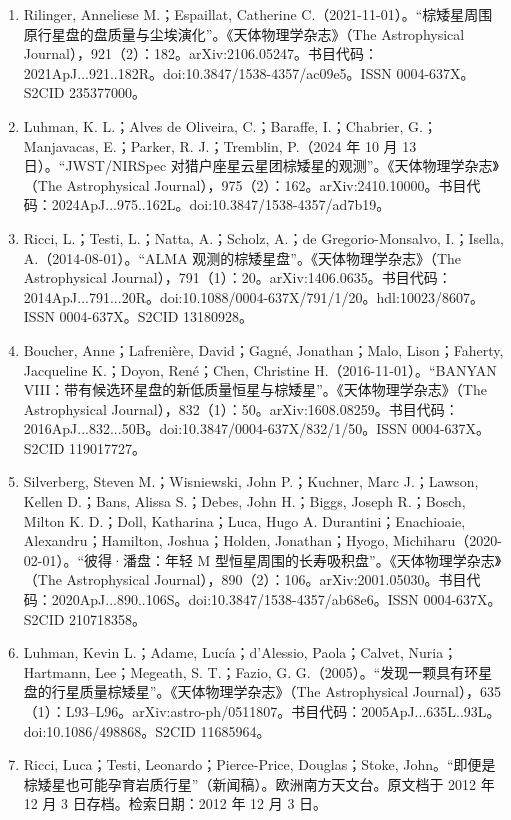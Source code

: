 \begin{enumerate}
\item Rilinger, Anneliese M.；Espaillat, Catherine C.（2021-11-01）。“棕矮星周围原行星盘的盘质量与尘埃演化”。《天体物理学杂志》（The Astrophysical Journal），921（2）：182。arXiv:2106.05247。书目代码：2021ApJ...921..182R。doi:10.3847/1538-4357/ac09e5。ISSN 0004-637X。S2CID 235377000。
\item Luhman, K. L.；Alves de Oliveira, C.；Baraffe, I.；Chabrier, G.；Manjavacas, E.；Parker, R. J.；Tremblin, P.（2024 年 10 月 13 日）。“JWST/NIRSpec 对猎户座星云星团棕矮星的观测”。《天体物理学杂志》（The Astrophysical Journal），975（2）：162。arXiv:2410.10000。书目代码：2024ApJ...975..162L。doi:10.3847/1538-4357/ad7b19。
\item Ricci, L.；Testi, L.；Natta, A.；Scholz, A.；de Gregorio-Monsalvo, I.；Isella, A.（2014-08-01）。“ALMA 观测的棕矮星盘”。《天体物理学杂志》（The Astrophysical Journal），791（1）：20。arXiv:1406.0635。书目代码：2014ApJ...791...20R。doi:10.1088/0004-637X/791/1/20。hdl:10023/8607。ISSN 0004-637X。S2CID 13180928。
\item Boucher, Anne；Lafrenière, David；Gagné, Jonathan；Malo, Lison；Faherty, Jacqueline K.；Doyon, René；Chen, Christine H.（2016-11-01）。“BANYAN VIII：带有候选环星盘的新低质量恒星与棕矮星”。《天体物理学杂志》（The Astrophysical Journal），832（1）：50。arXiv:1608.08259。书目代码：2016ApJ...832...50B。doi:10.3847/0004-637X/832/1/50。ISSN 0004-637X。S2CID 119017727。
\item Silverberg, Steven M.；Wisniewski, John P.；Kuchner, Marc J.；Lawson, Kellen D.；Bans, Alissa S.；Debes, John H.；Biggs, Joseph R.；Bosch, Milton K. D.；Doll, Katharina；Luca, Hugo A. Durantini；Enachioaie, Alexandru；Hamilton, Joshua；Holden, Jonathan；Hyogo, Michiharu（2020-02-01）。“彼得·潘盘：年轻 M 型恒星周围的长寿吸积盘”。《天体物理学杂志》（The Astrophysical Journal），890（2）：106。arXiv:2001.05030。书目代码：2020ApJ...890..106S。doi:10.3847/1538-4357/ab68e6。ISSN 0004-637X。S2CID 210718358。
\item Luhman, Kevin L.；Adame, Lucía；d’Alessio, Paola；Calvet, Nuria；Hartmann, Lee；Megeath, S. T.；Fazio, G. G.（2005）。“发现一颗具有环星盘的行星质量棕矮星”。《天体物理学杂志》（The Astrophysical Journal），635（1）：L93–L96。arXiv:astro-ph/0511807。书目代码：2005ApJ...635L..93L。doi:10.1086/498868。S2CID 11685964。
\item Ricci, Luca；Testi, Leonardo；Pierce-Price, Douglas；Stoke, John。“即便是棕矮星也可能孕育岩质行星”（新闻稿）。欧洲南方天文台。原文档于 2012 年 12 月 3 日存档。检索日期：2012 年 12 月 3 日。

\end{enumerate}
